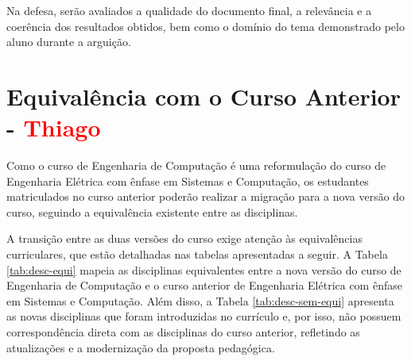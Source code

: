 Na defesa, serão avaliados a qualidade do documento final, a relevância e a coerência dos resultados obtidos, bem como o domínio do tema demonstrado pelo aluno durante a arguição.



\section{Equivalência com o Curso Anterior - \textcolor{red}{Thiago}}


Como o curso de Engenharia de Computação é uma reformulação do curso de Engenharia Elétrica com ênfase em Sistemas e Computação, os estudantes matriculados no curso anterior poderão realizar a migração para a nova versão do curso, seguindo a equivalência existente entre as disciplinas.%

A transição entre as duas versões do curso exige atenção às equivalências curriculares, que estão detalhadas nas tabelas apresentadas a seguir. A Tabela \ref{tab:desc-equi} mapeia as disciplinas equivalentes entre a nova versão do curso de Engenharia de Computação e o curso anterior de Engenharia Elétrica com ênfase em Sistemas e Computação. Além disso, a Tabela \ref{tab:desc-sem-equi} apresenta as novas disciplinas que foram introduzidas no currículo e, por isso, não possuem correspondência direta com as disciplinas do curso anterior, refletindo as atualizações e a modernização da proposta pedagógica.

